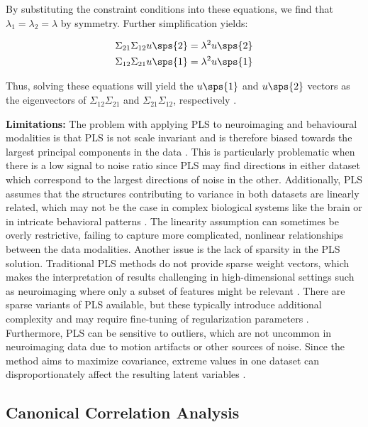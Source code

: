 By substituting the constraint conditions into these equations, we find that \( \lambda_1 = \lambda_2 = \lambda \) by symmetry. Further simplification yields:

\begin{align}
    \Sigma_{21} \Sigma_{12} u\sps{2} &= \lambda^2 u\sps{2} \\
    \Sigma_{12} \Sigma_{21} u\sps{1} &= \lambda^2 u\sps{1}
\end{align}

Thus, solving these equations will yield the \( u\sps{1} \) and \( u\sps{2} \) vectors as the eigenvectors of \( \Sigma_{12} \Sigma_{21} \) and \( \Sigma_{21} \Sigma_{12} \), respectively \cite{hoskuldsson1988pls}.

\textbf{Limitations: } The problem with applying PLS to neuroimaging and behavioural modalities is that PLS is not scale invariant and
is therefore biased towards the largest principal components in the data \cite{helmer2020stability}.
This is particularly problematic when there is a low signal to noise ratio since PLS may find directions in either dataset which correspond to the largest directions of noise in the other.
Additionally, PLS assumes that the structures contributing to variance in both datasets are linearly related, which
may not be the case in complex biological systems like the brain or in intricate behavioral patterns \cite{rosipal2005overview}.
The linearity assumption can sometimes be overly restrictive, failing to capture more complicated, nonlinear relationships between the data modalities.
Another issue is the lack of sparsity in the PLS solution.
Traditional PLS methods do not provide sparse weight vectors, which makes the interpretation of results challenging in high-dimensional settings such as neuroimaging where only a subset of features might be relevant \cite{leurgans1993canonical}.
There are sparse variants of PLS available, but these typically introduce additional complexity and may require fine-tuning of regularization parameters \cite{chun2010sparse}.
Furthermore, PLS can be sensitive to outliers, which are not uncommon in neuroimaging data due to motion artifacts or other sources of noise.
Since the method aims to maximize covariance, extreme values in one dataset can disproportionately affect the resulting latent variables \cite{wold1975path}.

\subsection{Canonical Correlation Analysis}\label{sec:cca}

